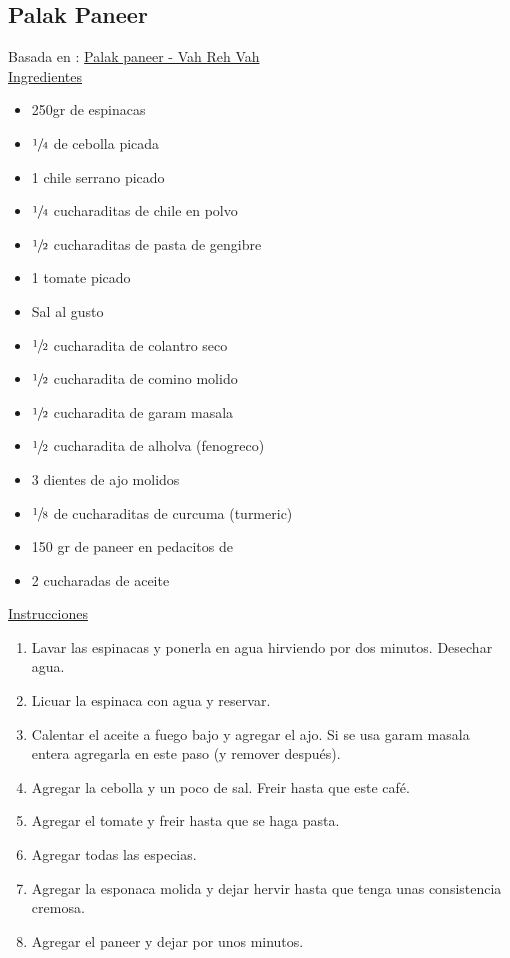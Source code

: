 \subsection{Palak Paneer}

Basada en : \href{https://www.vahrehvah.com/palak-paneer}{Palak paneer - Vah Reh Vah} \\

\underline{Ingredientes}
\begin{itemize}
\item 250gr de espinacas
\item $\sfrac{1}{4}$  de cebolla picada
\item 1 chile serrano picado
\item $\sfrac{1}{4}$ cucharaditas de chile en polvo
\item $\sfrac{1}{2}$ cucharaditas de pasta de gengibre
\item 1 tomate picado
\item Sal al gusto
\item $\sfrac{1}{2}$ cucharadita de colantro seco
\item $\sfrac{1}{2}$ cucharadita de comino molido
\item $\sfrac{1}{2}$ cucharadita de garam masala
\item $\sfrac{1}{2}$ cucharadita de alholva (fenogreco)
\item 3 dientes de ajo molidos
\item $\sfrac{1}{8}$ de cucharaditas de curcuma (turmeric)
\item 150 gr de paneer en pedacitos de \Sim 1cm
\item 2 cucharadas de aceite
\end{itemize}


\underline{Instrucciones}
\begin{enumerate}
\item Lavar las espinacas y ponerla en agua hirviendo por dos minutos. Desechar agua.
\item Licuar la espinaca con agua y reservar.
\item Calentar el aceite a fuego bajo y agregar el ajo. Si se usa garam masala entera agregarla en este paso (y remover después).
\item Agregar la cebolla y un poco de sal. Freir hasta que este café.
\item Agregar el tomate y freir hasta que se haga pasta.
\item Agregar todas las especias.
\item Agregar la esponaca molida y dejar hervir hasta que tenga unas consistencia cremosa.
\item Agregar el paneer y dejar por unos minutos.
\end{enumerate}
